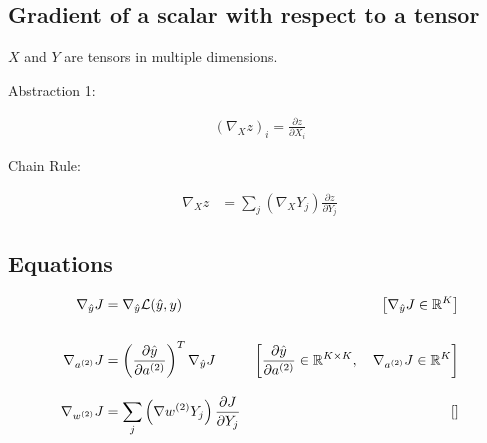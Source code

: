 \documentclass{article}
\begin{document}
\subsection{Gradient of a scalar with respect to a tensor}

$X$ and $Y$ are tensors in multiple dimensions.

Abstraction 1:

\begin{align}
    \left( \nabla_Xz \right)_i = \frac{\partial z}{\partial X_i}
\end{align}

Chain Rule:

\begin{align}
    \nabla_{X}z &= \sum_j \left( \nabla_{X}Y_j \right)\frac{\partial z}{\partial Y_j}
\end{align}



\subsection{Equations}


\begin{align}
    \nabla_{\hat y}J &= \nabla_{\hat y}\mathcal{L}(\hat y, y) &\left[ \nabla_{\hat y}J \in \mathbb{R}^{K} \right] \\ 
    \intertext{}
    \nabla_{a^{(2)}}J &= \left( \frac{\partial \hat y}{\partial a^{(2)}} \right)^T \nabla_{\hat y}J & \left[ \frac{\partial \hat y}{\partial a^{(2)}} \in \mathbb{R}^{K \times K}, \quad \nabla_{a^{(2)}}J
     \in \mathbb{R}^{K} \right] \\
    \intertext{}
    \nabla_{w^{(2)}}J &= \sum_j \left( \nabla{w^{(2)}} Y_j \right) \frac{\partial J }{\partial Y_j } & \left[  \right]\\
    \intertext{}
\end{align}
\end{document}
